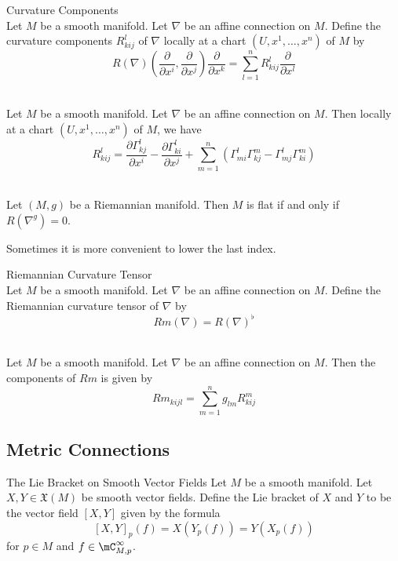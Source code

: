 \documentclass[a4paper]{article}
\begin{document}
\begin{defn}{Curvature Components}{}\\
Let $M$ be a smooth manifold. Let $\nabla$ be an affine connection on $M$. Define the curvature components $R_{kij}^l$ of $\nabla$ locally at a chart $(U,x^1,\dots,x^n)$ of $M$ by $$R(\nabla)\left(\frac{\partial}{\partial x^i},\frac{\partial}{\partial x^j}\right)\frac{\partial}{\partial x^k}=\sum_{l=1}^nR_{kij}^l\frac{\partial}{\partial x^l}$$
\end{defn}

\begin{prp}{}{}\\
Let $M$ be a smooth manifold. Let $\nabla$ be an affine connection on $M$. Then locally at a chart $(U,x^1,\dots,x^n)$ of $M$, we have $$R_{kij}^l=\frac{\partial\Gamma_{kj}^l}{\partial x^i}-\frac{\partial\Gamma_{ki}^l}{\partial x^j}+\sum_{m=1}^n\left(\Gamma_{mi}^l\Gamma_{kj}^m-\Gamma_{mj}^l\Gamma_{ki}^m\right)$$
\end{prp}

\begin{prp}{}{}\\
Let $(M,g)$ be a Riemannian manifold. Then $M$ is flat if and only if $R(\nabla^g)=0$. 
\end{prp}

Sometimes it is more convenient to lower the last index. 

\begin{defn}{Riemannian Curvature Tensor}{}\\
Let $M$ be a smooth manifold. Let $\nabla$ be an affine connection on $M$. Define the Riemannian curvature tensor of $\nabla$ by $$Rm(\nabla)=R(\nabla)^\flat$$
\end{defn}

\begin{lmm}{}{}\\
Let $M$ be a smooth manifold. Let $\nabla$ be an affine connection on $M$. Then the components of $Rm$ is given by $$Rm_{kijl}=\sum_{m=1}^ng_{lm}R_{kij}^m$$
\end{lmm}

\subsection{Metric Connections}
\begin{defn}{The Lie Bracket on Smooth Vector Fields}{} Let $M$ be a smooth manifold. Let $X,Y\in\mathfrak{X}(M)$ be smooth vector fields. Define the Lie bracket of $X$ and $Y$ to be the vector field $[X,Y]$ given by the formula $$[X,Y]_p(f)=X(Y_p(f))=Y(X_p(f))$$ for $p\in M$ and $f\in\mC_{M,p}^\infty$. 
\end{defn}
\end{document}
